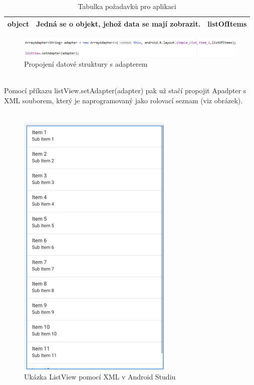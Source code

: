 \documentclass{vskpou} %
\begin{document}
\begin{itemize}
\begin{table}[h]
\begin{center}
\begin{tabular}{ |p{3cm}|p{3cm}|p{6cm}| }
             \\
            \hline
            object&
            Jedná se o objekt, jehož data se mají zobrazit.&
            listOfItems\\
            \hline
           
            \end{tabular}
            \caption{Tabulka požadavků pro aplikaci}
            \end{center}
            \end{table}
        
        
        
        
        
        

        \begin{figure}[h!]
        \centering
        \includegraphics[scale=0.5]{images/21.jpg}
        \caption{Propojení datové struktury s adapterem}
        \label{21}
        \end{figure}
        \\
        Pomocí příkazu listView.setAdapter(adapter) pak už stačí propojit Apadpter s XML souborem, který je naprogramovaný jako rolovací seznam (viz obrázek).\\
        \\
                \begin{figure}[h!]
        \centering
        \includegraphics[scale=0.5]{images/22.jpg}
        \caption{Ukázka ListView pomocí XML v Android Studiu}
        \label{22}
        \end{figure}\\
        

\end{itemize}
\end{document}
